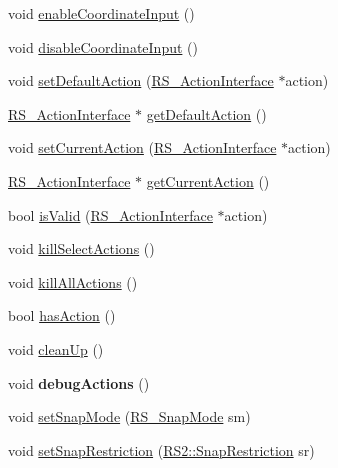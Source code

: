 \begin{DoxyCompactItemize}
\item 
void \hyperlink{classRS__EventHandler_a7d6db13956e1b6de13ed14bd7ea2c6cc}{enable\-Coordinate\-Input} ()
\item 
void \hyperlink{classRS__EventHandler_a4baabbea0587234676bfad1e4cfd0dd1}{disable\-Coordinate\-Input} ()
\item 
void \hyperlink{classRS__EventHandler_a1fb6a0d2ab584f553427e63a369a80b1}{set\-Default\-Action} (\hyperlink{classRS__ActionInterface}{R\-S\-\_\-\-Action\-Interface} $\ast$action)
\item 
\hyperlink{classRS__ActionInterface}{R\-S\-\_\-\-Action\-Interface} $\ast$ \hyperlink{classRS__EventHandler_a986e440c3ecb585ed34fab54ddef7f46}{get\-Default\-Action} ()
\item 
void \hyperlink{classRS__EventHandler_a3d40c1173beaabcf3325c1944e84d49f}{set\-Current\-Action} (\hyperlink{classRS__ActionInterface}{R\-S\-\_\-\-Action\-Interface} $\ast$action)
\item 
\hyperlink{classRS__ActionInterface}{R\-S\-\_\-\-Action\-Interface} $\ast$ \hyperlink{classRS__EventHandler_abb32b056c91d0d747eb6000ffbcd5a94}{get\-Current\-Action} ()
\item 
bool \hyperlink{classRS__EventHandler_a801a77a7765ac758b18f3f2de55b0458}{is\-Valid} (\hyperlink{classRS__ActionInterface}{R\-S\-\_\-\-Action\-Interface} $\ast$action)
\item 
void \hyperlink{classRS__EventHandler_a1b9bdf8245a7e9992c16e9ad89a2d5d3}{kill\-Select\-Actions} ()
\item 
void \hyperlink{classRS__EventHandler_a51f5c377885d6919d46641494801ccd6}{kill\-All\-Actions} ()
\item 
bool \hyperlink{classRS__EventHandler_a1675b5383f70cc8e0f855abb3df33e1d}{has\-Action} ()
\item 
void \hyperlink{classRS__EventHandler_a0f59545b4e5099e93cfa8d7b5320ec0f}{clean\-Up} ()
\item 
\hypertarget{classRS__EventHandler_a1163751fd58e27c95fafb615652c98c8}{void {\bfseries debug\-Actions} ()}\label{classRS__EventHandler_a1163751fd58e27c95fafb615652c98c8}

\item 
void \hyperlink{classRS__EventHandler_ae24865dd929f5dee4baa1af01a3e13da}{set\-Snap\-Mode} (\hyperlink{structRS__SnapMode}{R\-S\-\_\-\-Snap\-Mode} sm)
\item 
void \hyperlink{classRS__EventHandler_a5a31c0a7988d319cc7bc4784fcfd7866}{set\-Snap\-Restriction} (\hyperlink{classRS2_aac67b6890a08cff619c0fbef48377bae}{R\-S2\-::\-Snap\-Restriction} sr)
\end{DoxyCompactItemize}

